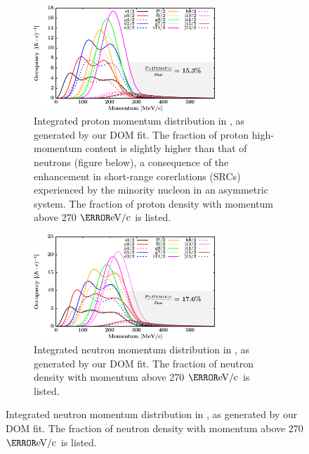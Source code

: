 \begin{figure}[tb]
    \centering
    \begin{subfigure}[c]{\textwidth}
        \centering
        \includegraphics[width=0.75\textwidth]{figures/pb208_protonLJMomentumDistIntegral.png}
        \caption[Proton momentum distribution in \pbEight]
        {
            Integrated proton momentum distribution in \pbEight, as generated
            by our DOM fit. The fraction of proton high-momentum content is
            slightly higher than that of neutrons
            (figure below), a consequence of the enhancement in short-range
            corerlations (SRCs) experienced by the minority nucleon in an
            asymmetric system. The fraction of proton density with
            momentum above 270 $\mega\electronvolt/\text{c}$ is listed.
        }
        \label{pb208ProtonMomentumDistInt}
    \end{subfigure}\vspace{16pt}
    \begin{subfigure}[c]{\textwidth}
        \centering
        \includegraphics[width=0.75\textwidth]{figures/pb208_neutronLJMomentumDistIntegral.png}
        \caption[Neutron momentum distributions in \pbEight]
        {
            Integrated neutron momentum distribution in \pbEight, as generated
            by our DOM fit. The fraction of neutron density with
            momentum above 270 $\mega\electronvolt/\text{c}$ is listed.
        }
        \label{pb208NeutronMomentumDistInt}
    \end{subfigure}
    \label{pb208Momenta}
\end{figure}

